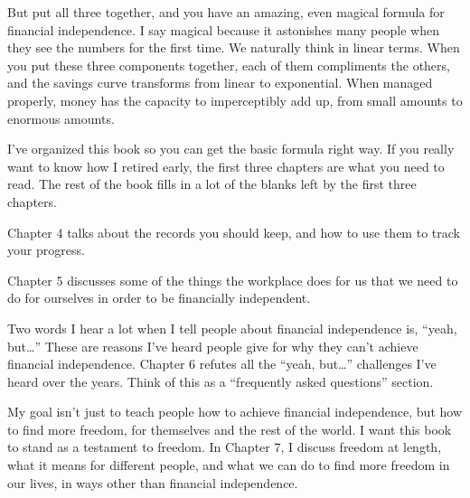 But put all three together, and you have an amazing, even magical formula for financial independence. I say magical because it astonishes many people when they see the numbers for the first time. We naturally think in linear terms. When you put these three components together, each of them compliments the others, and the savings curve transforms from linear to exponential. When managed properly, money has the capacity to imperceptibly add up, from small amounts to enormous amounts.

I've organized this book so you can get the basic formula right way. If you really want to know how I retired early, the first three chapters are what you need to read. The rest of the book fills in a lot of the blanks left by the first three chapters.

Chapter 4 talks about the records you should keep, and how to use them to track your progress.

Chapter 5 discusses some of the things the workplace does for us that we need to do for ourselves in order to be financially independent.

Two words I hear a lot when I tell people about financial independence is, ``yeah, but\ldots'' These are reasons I've heard people give for why they can't achieve financial independence. Chapter 6 refutes all the ``yeah, but\ldots'' challenges I've heard over the years. Think of this as a ``frequently asked questions'' section.

My goal isn't just to teach people how to achieve financial independence, but how to find more freedom, for themselves and the rest of the world. I want this book to stand as a testament to freedom. In Chapter 7, I discuss freedom at length, what it means for different people, and what we can do to find more freedom in our lives, in ways other than financial independence.

\newpage

